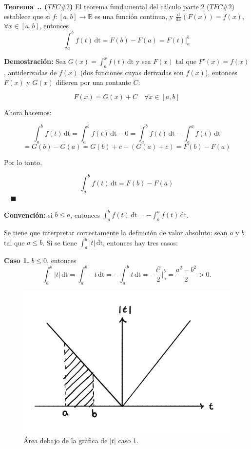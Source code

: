 \documentclass{article}
\numberwithin{equation}{section}
\newcommand{\Col}{\color{ProcessBlue}}
\newcommand{\derivate}[2]{\frac{\mathrm{d}}{\mathrm{d}#1} \left(  {#2}  \right)  }
\newcounter{theorem}[section]
\newenvironment
{theorem}[1][]
{\vspace{0.5cm}\refstepcounter{theorem}\par\medskip\noindent\textbf{\Col Teorema~\thesection.\thetheorem. #1}\rmfamily}
{}
\newenvironment
{proof}
{\par\medskip\noindent\textbf{Demostración:}\rmfamily}
{\Col\hfill$\quad \blacksquare$\vspace{0.5cm}}
\begin{document}
\begin{theorem}[($TFC \#2$)]
    El teorema fundamental del cálculo parte 2 ($TFC \#2$) establece que si $f:[a,b]\longrightarrow\mathbb{R}$ es una función continua, y $\derivate{x}{F(x)}=f(x)$, $\forall x\in [a,b]$, entonces 
    $$ \int_{a}^{b} \! {f(t)} \, \mathrm{dt}=F(b)-F(a)=F(t) \Big|_a^b $$ 
\end{theorem}

\begin{proof}
    Sea $G(x)=\int_{a}^{x} \! {f(t)} \, \mathrm{dt}$ y sea $F(x)$ tal que $F'(x)=f(x)$, antiderivadas de $f(x)$ (dos funciones cuyas derivadas son $f(x)$), entonces $F(x)$ y $G(x)$ difieren por una contante $C$:

    $$ F(x)=G(x)+C \quad \forall x\in [a,b] $$

    Ahora hacemos:

    $$\int_{a}^{b} \! {f(t)} \, \mathrm{dt}=\int_{a}^{b} \! {f(t)} \, \mathrm{dt}-0=\int_{a}^{b} \! {f(t)} \, \mathrm{dt}- \int_{a}^{a} \! {f(t)} \, \mathrm{dt}$$
    $$=G(b)-G(a)=G(b)+c-(G(a)+c)=F(b)-F(a)$$

    Por lo tanto, 

    $$ \int_{a}^{b} \! {f(t)} \, \mathrm{dt}=F(b)-F(a) $$
\end{proof}

\textbf{Convención:} si $b\leq a$, entonces $\int_{a}^{b} \! {f(t)} \, \mathrm{dt}=-\int_{b}^{a} \! {f(t)} \, \mathrm{dt}$.

\newpage

\vspace{1cm}

Se tiene que interpretar correctamente la definición de valor absoluto:  sean $a$ y $b$ tal que $a\leq b$. Si se tiene $\int_{a}^{b} \! {|t|} \, \mathrm{dt}$, entonces hay tres casos:

\vspace{0.5cm}

\textbf{Caso 1.} $b\leq 0$, entonces 
$$\int_{a}^{b} \! {|t|} \, \mathrm{dt}=\int_{a}^{b} \! {-t} \, \mathrm{dt}=-\int_{a}^{b} \! {t} \, \mathrm{dt}=-\frac{t^2}{2}\Big|_a^b=\frac{a^2-b^2}{2}>0.$$

\begin{figure}[h]
    \centering
    \includegraphics[scale=0.3]{images/fig3.png}
    \caption{Área debajo de la gráfica de $|t|$ caso 1.}
    \label{fig:fig3}
\end{figure}
\end{document}
